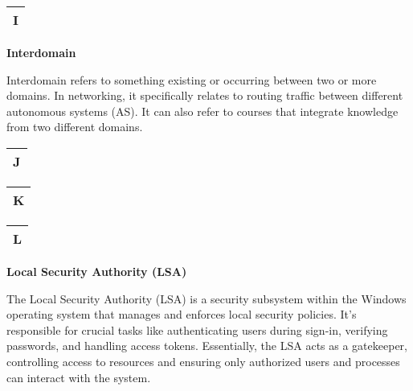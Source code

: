 \begin{table}
\justifying

\begin{tabular}{l}
\textbf{I} \\
\hline

\end{tabular}

\end{table}

\textbf{Interdomain}

Interdomain refers to something existing or occurring between two or more domains. In networking, it specifically relates to routing traffic between different autonomous systems (AS). It can also refer to courses that integrate knowledge from two different domains.

\begin{table}
\justifying

\begin{tabular}{l}
\textbf{J} \\
\hline

\end{tabular}

\end{table}

\begin{table}
\justifying

\begin{tabular}{l}
\textbf{K} \\
\hline

\end{tabular}

\end{table}

\begin{table}
\justifying

\begin{tabular}{l}
\textbf{L} \\
\hline

\end{tabular}

\end{table}

\textbf{Local Security Authority (LSA)}

The Local Security Authority (LSA) is a security subsystem within the Windows operating system that manages and enforces local security policies. It's responsible for crucial tasks like authenticating users during sign-in, verifying passwords, and handling access tokens. Essentially, the LSA acts as a gatekeeper, controlling access to resources and ensuring only authorized users and processes can interact with the system. 

